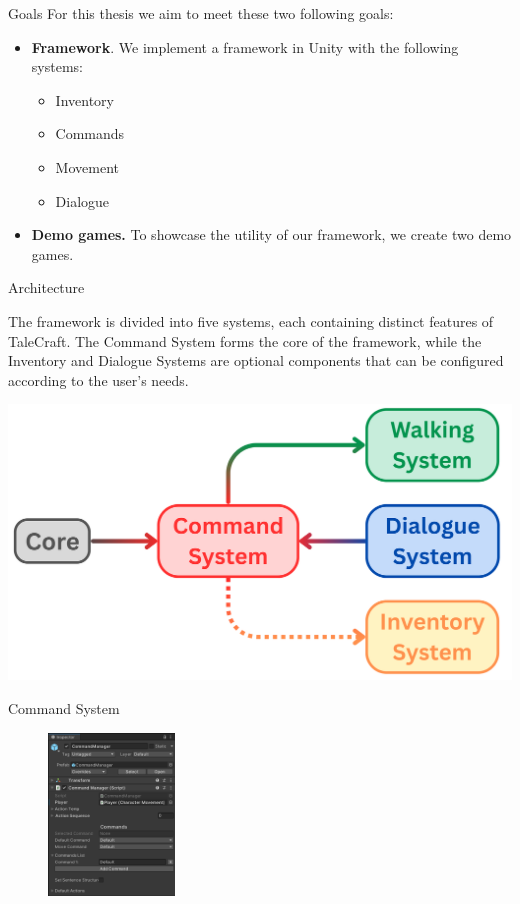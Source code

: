 \documentclass[portrait,a0paper,fontscale=0.33]{baposter}
\begin{document}
\begin{poster}
\begin{posterbox}[column=0, span=1, name=goals, below=background, headerColorOne=cyan!40, boxColorOne=cyan!10]{Goals}
For this thesis we aim to meet these two following goals:
\begin{itemize}
\item \textbf{Framework}. We implement a framework in Unity with the following systems:
\begin{itemize}
    \item Inventory
    \item Commands
    \item Movement
    \item Dialogue
\end{itemize}
\item \textbf{Demo games.} To showcase the utility of our framework, we create two demo games.
\end{itemize}

\end{posterbox}

\begin{posterbox}[column=0, span=1, name=architecture, below=goals]{Architecture}

The framework is divided into five systems, each containing distinct features of TaleCraft. The Command System forms the core of the framework, while the Inventory and Dialogue Systems are optional components that can be configured according to the user's needs.
\begin{center}
\includegraphics[width=0.3\linewidth]{img/framework.png}
\end{center}
\end{posterbox}

\begin{posterbox}[column=0, span=1, name=cs, below=architecture]{Command System}

\begin{figure}
\centering
\includegraphics[width=0.3\textwidth]{img/image_2025-07-08_214350710.png}
\end{figure}


\end{posterbox}
\end{poster}
\end{document}
